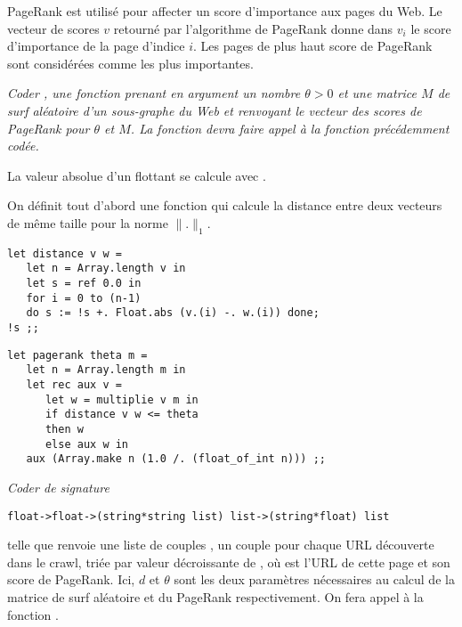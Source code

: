 PageRank est utilisé pour affecter un score d'importance aux pages du Web. Le vecteur de scores $v$ retourné par l'algorithme de PageRank donne dans $v_i$ le score d'importance de la page d'indice $i$. 
Les pages de plus haut score de PageRank sont considérées comme les plus importantes.
\begin{Exercise}\it 
Coder , une fonction prenant en argument un nombre $\theta>0$ et une matrice $M$ de surf aléatoire d'un sous-graphe du Web et renvoyant le vecteur des scores de PageRank pour $\theta$ et $M$. La fonction  devra faire appel à la fonction  précédemment codée.

La valeur absolue d'un flottant se calcule avec .
\end{Exercise}
\begin{Answer}
On définit tout d’abord une fonction qui calcule la distance entre deux vecteurs de même taille pour la norme $\|.\|_1$.
\begin{lstlisting}
let distance v w =
   let n = Array.length v in
   let s = ref 0.0 in
   for i = 0 to (n-1) 
   do s := !s +. Float.abs (v.(i) -. w.(i)) done;
!s ;;
\end{lstlisting}

\begin{lstlisting}
let pagerank theta m =
   let n = Array.length m in
   let rec aux v =
      let w = multiplie v m in
      if distance v w <= theta 
      then w 
      else aux w in
   aux (Array.make n (1.0 /. (float_of_int n))) ;;
\end{lstlisting}
\end{Answer}
\begin{Exercise}\it 
Coder  de signature
\begin{lstlisting}
float->float->(string*string list) list->(string*float) list
\end{lstlisting}
telle que  renvoie une liste de couples , un couple pour chaque URL découverte dans le crawl, triée par valeur décroissante de , où  est l'URL de cette page et  son score de PageRank. Ici, $d$ et $\theta$ sont les deux paramètres nécessaires au calcul de la matrice de surf aléatoire et du PageRank respectivement. On fera appel à la fonction .
\end{Exercise}
